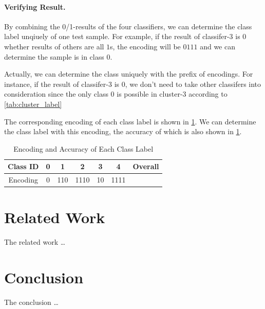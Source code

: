 \documentclass[sigplan,10pt,review]{acmart}\settopmatter{printfolios=true,printccs=false,printacmref=false}
\begin{document}
\paragraph{Verifying Result.}By combining the 0/1-results of the four classifiers, we can determine the class label unqiuely of one test sample.
For example, if the result of classifer-3 is $0$ whether results of others are all $1$s, the encoding will be $0111$ and we can determine the sample is in class $0$. 

Actually, we can determine the class uniquely with the prefix of encodings. 
For instance, if the result of classifer-3 is $0$, we don't need to take other classifers into consideration since the only class $0$ is possible in cluster-3 according to \cref{tab:cluster_label}

The corresponding encoding of each class label is shown in \cref{tab:encoding-and-accuarcy}. We can determine the class label with this encoding, the accuracy of which is also shown in \cref{tab:encoding-and-accuarcy}.

\begin{table}[h]
    \caption{Encoding and Accuracy of Each Class Label}
    \label{tab:encoding-and-accuarcy}
	\begin{tabular}{|c|c|c|c|c|c|c|}
	\hline
	Class ID & 0 & 1 & 2 & 3 & 4 & Overall \\
	\hline
	Encoding &0 & 110 & 1110 &10 & 1111 &\\
	\hline
	\end{tabular}
\end{table}


\section{Related Work}
The related work \dots

\section{Conclusion}
The conclusion \dots


% 
% 




\end{document}
